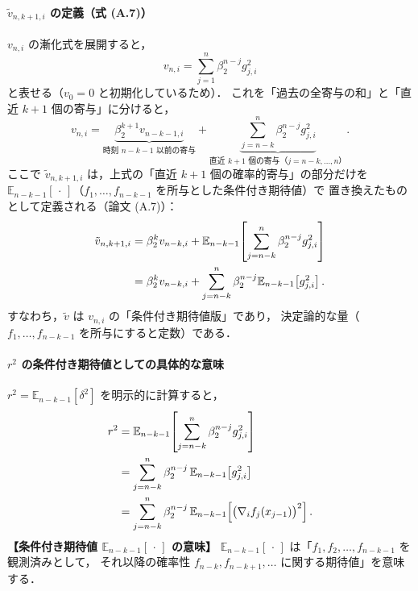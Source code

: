 \documentclass[dvipdfmx,a4paper,11pt]{jsarticle}
\begin{document}
\medskip
\paragraph{$\tilde{v}_{n,k+1,i}$ の定義（式 (A.7)）}

$v_{n,i}$ の漸化式を展開すると，
\begin{equation}
    v_{n,i} = \sum_{j=1}^{n} \beta_2^{n-j} g_{j,i}^2
    \label{eq:v_expand}
\end{equation}
と表せる（$v_0 = 0$ と初期化しているため）．
これを「過去の全寄与の和」と「直近 $k+1$ 個の寄与」に分けると，
\begin{equation}
    v_{n,i}
    = \underbrace{\beta_2^{k+1} v_{n-k-1,i}}_{\text{時刻 $n-k-1$ 以前の寄与}}
    + \underbrace{\sum_{j=n-k}^{n} \beta_2^{n-j} g_{j,i}^2}_{\text{直近 $k+1$ 個の寄与（$j = n-k, \ldots, n$）}}.
    \label{eq:v_split}
\end{equation}
ここで $\tilde{v}_{n,k+1,i}$ は，上式の「直近 $k+1$ 個の確率的寄与」の部分だけを
$\mathbb{E}_{n-k-1}[\,\cdot\,]$（$f_1, \ldots, f_{n-k-1}$ を所与とした条件付き期待値）で
置き換えたものとして定義される（論文 (A.7)）：
\begin{align}
    \tilde{v}_{n,k+1,i}
    &= \beta_2^k v_{n-k,i}
      + \mathbb{E}_{n-k-1}\!\left[\sum_{j=n-k}^{n} \beta_2^{n-j} g_{j,i}^2\right] \notag\\
    &= \beta_2^k v_{n-k,i}
      + \sum_{j=n-k}^{n} \beta_2^{n-j} \mathbb{E}_{n-k-1}\!\left[g_{j,i}^2\right].
    \label{eq:vtilde_def}
\end{align}
すなわち，$\tilde{v}$ は $v_{n,i}$ の「条件付き期待値版」であり，
決定論的な量（$f_1,\ldots,f_{n-k-1}$ を所与にすると定数）である．


\bigskip
\paragraph{$r^2$ の条件付き期待値としての具体的な意味}

$r^2 = \mathbb{E}_{n-k-1}[\delta^2]$ を明示的に計算すると，
\begin{align}
    r^2
    &= \mathbb{E}_{n-k-1}\!\left[\sum_{j=n-k}^{n} \beta_2^{n-j} g_{j,i}^2\right] \notag\\
    &= \sum_{j=n-k}^{n} \beta_2^{n-j}\, \mathbb{E}_{n-k-1}\!\left[g_{j,i}^2\right] \notag\\
    &= \sum_{j=n-k}^{n} \beta_2^{n-j}\,
       \mathbb{E}_{n-k-1}\!\left[\bigl(\nabla_i f_j(x_{j-1})\bigr)^2\right].
    \label{eq:r2_explicit}
\end{align}
\noindent
\textbf{【条件付き期待値 $\mathbb{E}_{n-k-1}[\,\cdot\,]$ の意味】}
$\mathbb{E}_{n-k-1}[\,\cdot\,]$ は「$f_1, f_2, \ldots, f_{n-k-1}$ を観測済みとして，
それ以降の確率性 $f_{n-k}, f_{n-k+1}, \ldots$ に関する期待値」を意味する．
\end{document}
